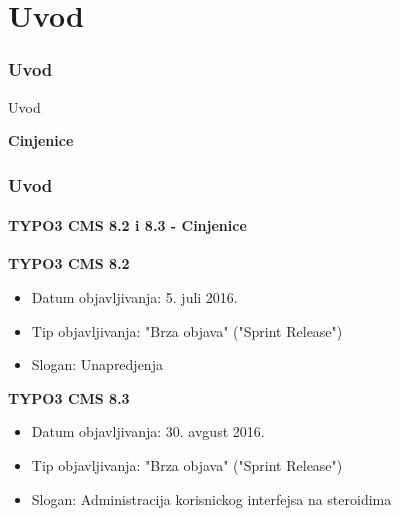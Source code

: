 %

\section{Uvod}
\begin{frame}[fragile]
	\frametitle{Uvod}

	\begin{center}\huge{Uvod}\end{center}
	\begin{center}\huge{\color{typo3darkgrey}\textbf{Cinjenice}}\end{center}

\end{frame}

\begin{frame}[fragile]
	\frametitle{Uvod}
	\framesubtitle{TYPO3 CMS 8.2 i 8.3 - Cinjenice}

	\textbf{TYPO3 CMS 8.2}
	\begin{itemize}
		\item Datum objavljivanja: 5. juli 2016.
		\item Tip objavljivanja: "Brza objava" ("Sprint Release")
		\item Slogan: Unapredjenja
	\end{itemize}

	\vspace{0.6cm}

	\textbf{TYPO3 CMS 8.3}
	\begin{itemize}
		\item Datum objavljivanja: 30. avgust 2016.
		\item Tip objavljivanja: "Brza objava" ("Sprint Release")
		\item Slogan: Administracija korisnickog interfejsa na steroidima
	\end{itemize}


\end{frame}

